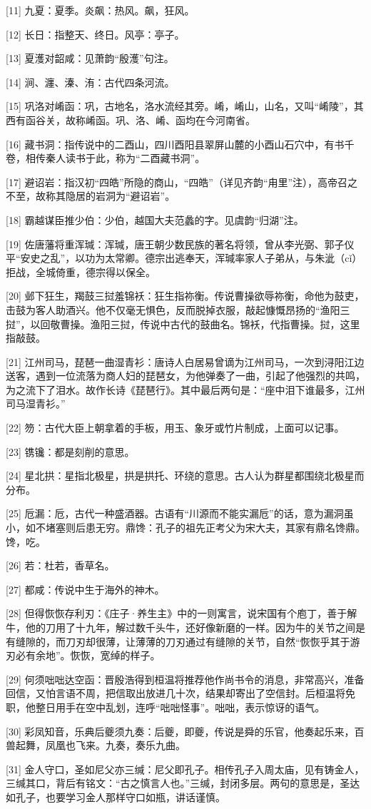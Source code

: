 \documentclass[12pt,UTF8]{ctexbook}
\begin{document}
[11] 九夏：夏季。炎飙：热风。飙，狂风。

[12] 长日：指整天、终日。风亭：亭子。

[13] 夏濩对韶咸：见萧韵“殷濩”句注。

[14] 涧、瀍、溱、洧：古代四条河流。

[15] 巩洛对崤函：巩，古地名，洛水流经其旁。崤，崤山，山名，又叫“崤陵”，其西有函谷关，故称崤函。巩、洛、崤、函均在今河南省。

[16] 藏书洞：指传说中的二酉山，四川酉阳县翠屏山麓的小酉山石穴中，有书千卷，相传秦人读书于此，称为“二酉藏书洞”。

[17] 避诏岩：指汉初“四皓”所隐的商山，“四皓”（详见齐韵“甪里”注），高帝召之不至，故称其隐居的岩洞为“避诏岩”。

[18] 霸越谋臣推少伯：少伯，越国大夫范蠡的字。见虞韵“归湖”注。

[19] 佐唐藩将重浑瑊：浑瑊，唐王朝少数民族的著名将领，曾从李光弼、郭子仪平“安史之乱”，以功为太常卿。德宗出逃奉天，浑瑊率家人子弟从，与朱泚（cǐ）拒战，全城倚重，德宗得以保全。

[20] 邺下狂生，羯鼓三挝羞锦袄：狂生指祢衡。传说曹操欲辱祢衡，命他为鼓吏，击鼓为客人助酒兴。他不仅毫无惧色，反而脱掉衣服，敲起慷慨昂扬的“渔阳三挝”，以回敬曹操。渔阳三挝，传说中古代的鼓曲名。锦袄，代指曹操。挝，这里指敲鼓。

[21] 江州司马，琵琶一曲湿青衫：唐诗人白居易曾谪为江州司马，一次到浔阳江边送客，遇到一位流落为商人妇的琵琶女，为他弹奏了一曲，引起了他强烈的共鸣，为之流下了泪水。故作长诗《琵琶行》。其中最后两句是：“座中泪下谁最多，江州司马湿青衫。”

[22] 笏：古代大臣上朝拿着的手板，用玉、象牙或竹片制成，上面可以记事。

[23] 镌镵：都是刻削的意思。

[24] 星北拱：星指北极星，拱是拱托、环绕的意思。古人认为群星都围绕北极星而分布。

[25] 卮漏：卮，古代一种盛酒器。古语有“川源而不能实漏卮”的话，意为漏洞虽小，如不堵塞则后患无穷。鼎馋：孔子的祖先正考父为宋大夫，其家有鼎名馋鼎。馋，吃。

[26] 若：杜若，香草名。

[27] 都咸：传说中生于海外的神木。

[28] 但得恢恢存利刃：《庄子·养生主》中的一则寓言，说宋国有个庖丁，善于解牛，他的刀用了十九年，解过数千头牛，还好像新磨的一样。因为牛的关节之间是有缝隙的，而刀刃却很薄，让薄薄的刀刃通过有缝隙的关节，自然“恢恢乎其于游刃必有余地”。恢恢，宽绰的样子。

[29] 何须咄咄达空函：晋殷浩得到桓温将推荐他作尚书令的消息，非常高兴，准备回信，又怕言语不周，把信取出放进几十次，结果却寄出了空信封。后桓温将免职，他整日用手在空中乱划，连呼“咄咄怪事”。咄咄，表示惊讶的语气。

[30] 彩凤知音，乐典后夔须九奏：后夔，即夔，传说是舜的乐官，他奏起乐来，百兽起舞，凤凰也飞来。九奏，奏乐九曲。

[31] 金人守口，圣如尼父亦三缄：尼父即孔子。相传孔子入周太庙，见有铸金人，三缄其口，背后有铭文：“古之慎言人也。”三缄，封闭多层。两句的意思是，圣达如孔子，也要学习金人那样守口如瓶，讲话谨慎。

\backmatter
\end{document}
